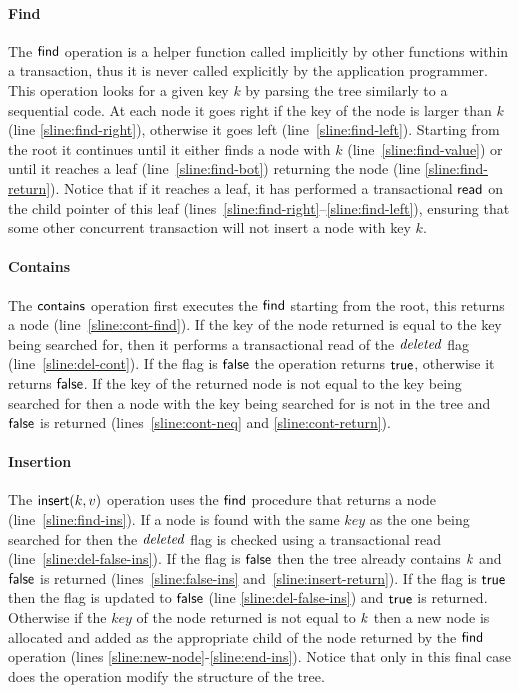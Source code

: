 \paragraph{Find} 
The $\act{find}$ operation is a helper function called implicitly by other functions within a transaction, 
thus it is never called explicitly by the application programmer.
This operation looks for a given key $k$ by parsing the tree similarly to a sequential code.
At each node it goes right if the key of the node is larger than $k$ (line \ref{sline:find-right}), otherwise it goes left (line~\ref{sline:find-left}).
Starting from the root it continues until it either finds a node with $k$ (line~\ref{sline:find-value}) or until it reaches a leaf (line~\ref{sline:find-bot}) 
returning the node (line \ref{sline:find-return}).
Notice that if it reaches a leaf, it has performed a transactional $\act{read}$ on the child pointer of this leaf (lines~\ref{sline:find-right}--\ref{sline:find-left}), ensuring that 
some other concurrent transaction will not insert a node with key $k$.

\paragraph{Contains} 
The $\act{contains}$ operation first executes the $\act{find}$ starting from the root, this returns a node (line~\ref{sline:cont-find}).
If the key of the node returned is equal to the key being searched for, then it performs a transactional read of the $\ms{deleted}$ flag (line~\ref{sline:del-cont}).
If the flag is $\lit{false}$ the operation returns $\lit{true}$, otherwise it returns $\lit{false}$.
If the key of the returned node is not equal to the key being searched for then a node with the key being searched for is not in the tree and $\lit{false}$ is returned (lines~\ref{sline:cont-neq} and \ref{sline:cont-return}).

\paragraph{Insertion} The $\act{insert}(k,v)$ operation uses the $\act{find}$ procedure that returns a node (line~\ref{sline:find-ins}).
If a node is found with the same $key$ as the one being searched for then the $\ms{deleted}$ flag is checked using a transactional read (line~\ref{sline:del-false-ins}).
If the flag is $\lit{false}$ then the tree already contains $\ms{k}$ and $\lit{false}$ is returned (lines~\ref{sline:false-ins} and~\ref{sline:insert-return}).
If the flag is $\lit{true}$ then the flag is updated to $\lit{false}$ (line \ref{sline:del-false-ins}) and $\lit{true}$ is returned.
Otherwise if the $key$ of the node returned is not equal to $\ms{k}$ then a new node is allocated and added as the
appropriate child of the node returned by the $\act{find}$ operation (lines \ref{sline:new-node}-\ref{sline:end-ins}).
Notice that only in this final case does the operation modify the structure of the tree.

